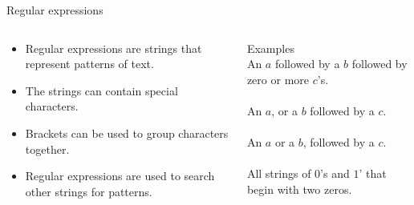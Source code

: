  \begin{frame}{Regular expressions}
  \begin{columns}[T]
    \begin{column}{0.5\textwidth}
      \begin{itemize}
        \setlength\itemsep{5mm}
        \item Regular expressions are strings that represent patterns of text.
        \item The strings can contain special characters.
        \item Brackets can be used to group characters together.
        \item Regular expressions are used to search other strings for patterns.
      \end{itemize}
    \end{column}
\vrule{}
    \begin{column}{0.5\textwidth}
      \begin{exampleblock}{Examples}
         \\
        An $a$ followed by a $b$ followed by zero or more $c$'s. \\
         \\
        An $a$, or a $b$ followed by a $c$. \\
         \\
        An $a$ or a $b$, followed by a $c$. \\
        \\
        All strings of $0$'s and $1$' that begin with two zeros.
      \end{exampleblock}
    \end{column}
  \end{columns}
\end{frame}


